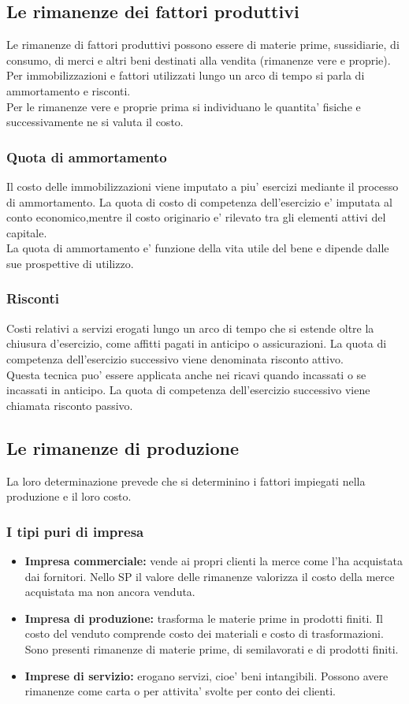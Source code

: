 \documentclass{report}
\begin{document}
	\subsection{Le rimanenze dei fattori produttivi}
	Le rimanenze di fattori produttivi possono essere di materie prime, sussidiarie, di consumo, di merci e altri beni destinati alla vendita (rimanenze vere e proprie). Per immobilizzazioni e fattori utilizzati lungo un arco di tempo si parla di ammortamento e risconti.\medskip \\Per le rimanenze vere e proprie prima si individuano le quantita' fisiche e successivamente ne si valuta il costo.
	\subsubsection{Quota di ammortamento}
	Il costo delle immobilizzazioni viene imputato a piu' esercizi mediante il processo di ammortamento. La quota di costo di competenza dell'esercizio e' imputata al conto economico,mentre il costo originario e' rilevato tra gli elementi attivi del capitale.
	\medskip \\La quota di ammortamento e' funzione della vita utile del bene e dipende dalle sue prospettive di utilizzo.
	\subsubsection{Risconti}
	Costi relativi a servizi erogati lungo un arco di tempo che si estende oltre la chiusura d'esercizio, come affitti pagati in anticipo o assicurazioni. La quota di competenza dell'esercizio successivo viene denominata risconto attivo.\medskip \\Questa tecnica puo' essere applicata anche nei ricavi quando incassati o se incassati in anticipo. La quota di competenza dell'esercizio successivo viene chiamata risconto passivo.
	\subsection{Le rimanenze di produzione}
	La loro determinazione prevede che si determinino i fattori impiegati nella produzione e il loro costo.
	\subsubsection{I tipi puri di impresa}
	\begin{itemize}
		\item \textbf{Impresa commerciale:} vende ai propri clienti la merce come l'ha acquistata dai fornitori. Nello SP il valore delle rimanenze valorizza il costo della merce acquistata ma non ancora venduta.
		\item \textbf{Impresa di produzione:} trasforma le materie prime in prodotti finiti. Il costo del venduto comprende costo dei materiali e costo di trasformazioni. Sono presenti rimanenze di materie prime, di semilavorati e di prodotti finiti.
		\item \textbf{Imprese di servizio:} erogano servizi, cioe' beni intangibili. Possono avere rimanenze come carta o per attivita' svolte per conto dei clienti.
	\end{itemize}
\end{document}
